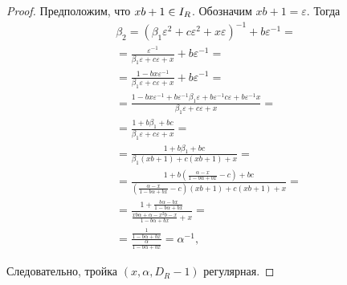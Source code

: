 \documentclass[_00_dissertation.tex]{subfiles}
\begin{document}
\begin{proof}
    Предположим, что $xb + 1 \in I_{R}$.
    Обозначим $xb + 1 = \varepsilon$.
    Тогда
    \begin{equation*}
        \begin{split}
            \beta_2 = \left(
                \beta_1 \varepsilon^2 + c\varepsilon^2 + x\varepsilon
            \right)^{-1} + b\varepsilon^{-1} = \\
            = \frac{\varepsilon^{-1}}{\beta_1 \varepsilon + c\varepsilon + x} + b\varepsilon^{-1} = \\
            = \frac{1 - bx\varepsilon^{-1}}{\beta_1 \varepsilon + c\varepsilon + x} + b\varepsilon^{-1} = \\
            = \frac{1 - bx\varepsilon^{-1} + b\varepsilon^{-1}\beta_1 \varepsilon + b\varepsilon^{-1}c\varepsilon + b\varepsilon^{-1}x}{\beta_1 \varepsilon + c\varepsilon + x} = \\
            = \frac{1 + b\beta_1 + bc}{\beta_1 \varepsilon + c\varepsilon + x} = \\
            = \frac{1 + b\beta_1 + bc}{\beta_1(xb + 1) + c(xb + 1) + x} = \\
            = \frac{
                1 + b\left(
                    \frac{\alpha - x}{1 - b\alpha + bx} - c
                \right) + bc
            }{
                \left(
                    \frac{\alpha - x}{1 - b\alpha + bx} - c
                \right)(xb + 1) + c(xb + 1) + x
            } = \\
            = \frac{
                1 + \frac{b\alpha - bx}{1 - b\alpha + bx}
            }{
                \frac{xb\alpha + \alpha - x^2b - x}{1 - b\alpha + bx} + x
            } = \\
            = \frac{
                \frac{1}{1 - b\alpha + bx}
            }{
                \frac{\alpha}{1 - b\alpha + bx}
            } = \alpha^{-1},
        \end{split}
    \end{equation*}
    
    Следовательно, тройка $(x, \alpha, D_R - 1)$ регулярная.
\end{proof}
\end{document}
